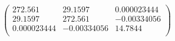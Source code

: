 \documentclass{article}
\begin{document}
\[\left(
\begin{array}{ccc}
 272.561 & 29.1597 & 0.000023444 \\
 29.1597 & 272.561 & -0.00334056 \\
 0.000023444 & -0.00334056 & 14.7844 \\
\end{array}
\right)\]
\end{document}
